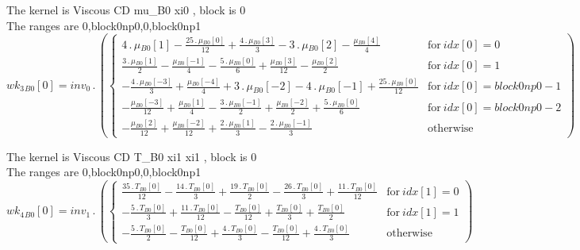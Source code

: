 \documentclass{article}
\begin{document}
\noindent The kernel is Viscous CD mu_B0 xi0 , block is 0\\\noindent The ranges are 0,block0np0,0,block0np1\\\begin{dmath}{wk_{3}{_{B0}}}[{0}] = inv_0 \,.\, \left(\begin{cases} 4 \,.\, {\mu{_{B0}}}[{1}] - \frac{25 \,.\, {\mu{_{B0}}}[{0}]}{12} + \frac{4 \,.\, {\mu{_{B0}}}[{3}]}{3} - 3 \,.\, {\mu{_{B0}}}[{2}] - \frac{{\mu{_{B0}}}[{4}]}{4} & \text{for}\: 
{idx}[{0}] = 0 \\\frac{3 \,.\, {\mu{_{B0}}}[{1}]}{2} - \frac{{\mu{_{B0}}}[{-1}]}{4} - \frac{5 \,.\, {\mu{_{B0}}}[{0}]}{6} + \frac{{\mu{_{B0}}}[{3}]}{12} - \frac{{\mu{_{B0}}}[{2}]}{2} & \text{for}\: {idx}[{0}] = 1 \\- \frac{4 \,.\, 
{\mu{_{B0}}}[{-3}]}{3} + \frac{{\mu{_{B0}}}[{-4}]}{4} + 3 \,.\, {\mu{_{B0}}}[{-2}] - 4 \,.\, {\mu{_{B0}}}[{-1}] + \frac{25 \,.\, {\mu{_{B0}}}[{0}]}{12} & \text{for}\: {idx}[{0}] = block0np0 - 1 \\- \frac{{\mu{_{B0}}}[{-3}]}{12} + 
\frac{{\mu{_{B0}}}[{1}]}{4} - \frac{3 \,.\, {\mu{_{B0}}}[{-1}]}{2} + \frac{{\mu{_{B0}}}[{-2}]}{2} + \frac{5 \,.\, {\mu{_{B0}}}[{0}]}{6} & \text{for}\: {idx}[{0}] = block0np0 - 2 \\- \frac{{\mu{_{B0}}}[{2}]}{12} + \frac{{\mu{_{B0}}}[{-2}]}{12} + 
\frac{2 \,.\, {\mu{_{B0}}}[{1}]}{3} - \frac{2 \,.\, {\mu{_{B0}}}[{-1}]}{3} & \text{otherwise} \end{cases}\right)\end{dmath}

\noindent The kernel is Viscous CD T_B0 xi1 xi1 , block is 0\\\noindent The ranges are 0,block0np0,0,block0np1\\\begin{dmath}{wk_{4}{_{B0}}}[{0}] = inv_1 \,.\, \left(\begin{cases} \frac{35 \,.\, {T{_{B0}}}[{0}]}{12} - \frac{14 \,.\, {T{_{B0}}}[{0}]}{3} + \frac{19 \,.\, {T{_{B0}}}[{0}]}{2} - \frac{26 \,.\, {T{_{B0}}}[{0}]}{3} + \frac{11 \,.\, 
{T{_{B0}}}[{0}]}{12} & \text{for}\: {idx}[{1}] = 0 \\- \frac{5 \,.\, {T{_{B0}}}[{0}]}{3} + \frac{11 \,.\, {T{_{B0}}}[{0}]}{12} - \frac{{T{_{B0}}}[{0}]}{12} + \frac{{T{_{B0}}}[{0}]}{3} + \frac{{T{_{B0}}}[{0}]}{2} & \text{for}\: {idx}[{1}] = 1 \\- 
\frac{5 \,.\, {T{_{B0}}}[{0}]}{2} - \frac{{T{_{B0}}}[{0}]}{12} + \frac{4 \,.\, {T{_{B0}}}[{0}]}{3} - \frac{{T{_{B0}}}[{0}]}{12} + \frac{4 \,.\, {T{_{B0}}}[{0}]}{3} & \text{otherwise} \end{cases}\right)\end{dmath}
\end{document}

